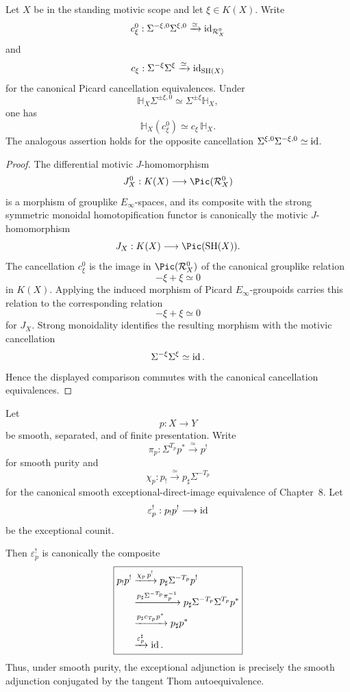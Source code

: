 \begin{lemma}
\label{lem:dr-int-thom-cancellation-homotopification}
Let \(X\) be in the standing motivic scope and let
\(\xi\in K(X)\).  Write
\[
    c_\xi^0:
    \Sigma^{-\xi,0}\Sigma^{\xi,0}
    \xrightarrow{\simeq}
    \operatorname{id}_{\mathcal R_X^0}
\]
and
\[
    c_\xi:
    \Sigma^{-\xi}\Sigma^\xi
    \xrightarrow{\simeq}
    \operatorname{id}_{\mathrm{SH}(X)}
\]
for the canonical Picard cancellation equivalences.  Under
\[
    \mathbb H_X\Sigma^{\pm\xi,0}
    \simeq
    \Sigma^{\pm\xi}\mathbb H_X,
\]
one has
\[
\boxed{
    \mathbb H_X(c_\xi^0)
    \simeq
    c_\xi\,\mathbb H_X.
}
\]
The analogous assertion holds for the opposite cancellation
\(\Sigma^{\xi,0}\Sigma^{-\xi,0}\simeq\operatorname{id}\).
\end{lemma}

\begin{proof}
The differential motivic \(J\)-homomorphism
\[
    J_X^0:
    K(X)\longrightarrow\Pic(\mathcal R_X^0)
\]
is a morphism of grouplike \(E_\infty\)-spaces, and its composite with
the strong symmetric monoidal homotopification functor is canonically
the motivic \(J\)-homomorphism
\[
    J_X:
    K(X)\longrightarrow\Pic(\SH(X)).
\]
The cancellation \(c_\xi^0\) is the image in
\(\Pic(\mathcal R_X^0)\) of the canonical grouplike relation
\[
    -\xi+\xi\simeq0
\]
in \(K(X)\).  Applying the induced morphism of Picard
\(E_\infty\)-groupoids carries this relation to the corresponding
relation
\[
    -\xi+\xi\simeq0
\]
for \(J_X\).  Strong monoidality identifies the resulting morphism with
the motivic cancellation
\[
    \Sigma^{-\xi}\Sigma^\xi\simeq\operatorname{id}.
\]
Hence the displayed comparison commutes with the canonical cancellation
equivalences.
\end{proof}

\begin{lemma}
\label{lem:dr-int-purity-counit}
Let
\[
    p:X\longrightarrow Y
\]
be smooth, separated, and of finite presentation.  Write
\[
    \pi_p:
    \Sigma^{T_p}p^*
    \xrightarrow{\simeq}
    p^!
\]
for smooth purity and
\[
    \chi_p:
    p_!
    \xrightarrow{\simeq}
    p_\sharp\Sigma^{-T_p}
\]
for the canonical smooth exceptional-direct-image equivalence of
Chapter~8.  Let
\[
    \varepsilon_p^!:
    p_!p^!\longrightarrow\operatorname{id}
\]
be the exceptional counit.

Then \(\varepsilon_p^!\) is canonically the composite
\[
\boxed{
\begin{aligned}
    p_!p^!
    &\xrightarrow{\chi_p\,p^!}
    p_\sharp\Sigma^{-T_p}p^!
    \\
    &\xrightarrow{
        p_\sharp\Sigma^{-T_p}\pi_p^{-1}
    }
    p_\sharp
    \Sigma^{-T_p}\Sigma^{T_p}p^*
    \\
    &\xrightarrow{
        p_\sharp c_{T_p}p^*
    }
    p_\sharp p^*
    \\
    &\xrightarrow{\varepsilon_p^\sharp}
    \operatorname{id} .
\end{aligned}
}
\]
Thus, under smooth purity, the exceptional adjunction is precisely the
smooth adjunction conjugated by the tangent Thom autoequivalence.
\end{lemma}

